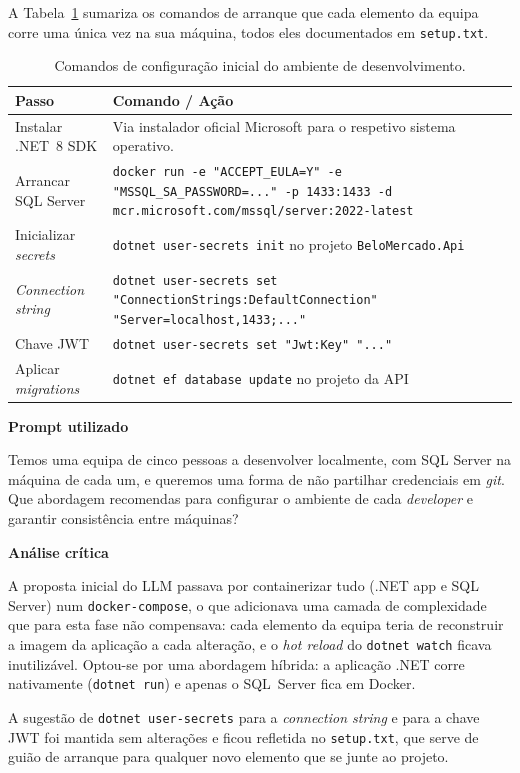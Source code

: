     A Tabela~\ref{tab:ambiente_dev} sumariza os comandos de arranque que cada elemento da equipa corre uma única vez na sua máquina, todos eles documentados em \texttt{setup.txt}.

    \begin{table}[H]
    \centering
    \small
    \begin{tabular}{|p{4cm}|p{10cm}|}
    \hline
    \textbf{Passo} & \textbf{Comando / Ação} \\
    \hline
    Instalar .NET~8 SDK & Via instalador oficial Microsoft para o respetivo sistema operativo. \\
    \hline
    Arrancar SQL Server  & \texttt{docker run -e "ACCEPT\_EULA=Y" -e "MSSQL\_SA\_PASSWORD=..." -p 1433:1433 -d mcr.microsoft.com/mssql/server:2022-latest} \\
    \hline
    Inicializar \textit{secrets} & \texttt{dotnet user-secrets init} no projeto \texttt{BeloMercado.Api} \\
    \hline
    \textit{Connection string} & \texttt{dotnet user-secrets set "ConnectionStrings:DefaultConnection" "Server=localhost,1433;..."} \\
    \hline
    Chave JWT & \texttt{dotnet user-secrets set "Jwt:Key" "..."} \\
    \hline
    Aplicar \textit{migrations} & \texttt{dotnet ef database update} no projeto da API \\
    \hline
    \end{tabular}
    \caption{Comandos de configuração inicial do ambiente de desenvolvimento.}
    \label{tab:ambiente_dev}
    \end{table}

    \begin{tcolorbox}[title=Interação com o LLM]
    \textbf{Prompt utilizado}

    Temos uma equipa de cinco pessoas a desenvolver localmente, com SQL Server na máquina de cada um, e queremos uma forma de não partilhar credenciais em \textit{git}. Que abordagem recomendas para configurar o ambiente de cada \textit{developer} e garantir consistência entre máquinas?

    \tcblower

    \textbf{Análise crítica}

    A proposta inicial do LLM passava por containerizar tudo (.NET app e SQL Server) num \texttt{docker-compose}, o que adicionava uma camada de complexidade que para esta fase não compensava: cada elemento da equipa teria de reconstruir a imagem da aplicação a cada alteração, e o \textit{hot reload} do \texttt{dotnet watch} ficava inutilizável. Optou-se por uma abordagem híbrida: a aplicação .NET corre nativamente (\texttt{dotnet run}) e apenas o SQL~Server fica em Docker.

    A sugestão de \texttt{dotnet user-secrets} para a \textit{connection string} e para a chave JWT foi mantida sem alterações e ficou refletida no \texttt{setup.txt}, que serve de guião de arranque para qualquer novo elemento que se junte ao projeto.
    \end{tcolorbox}

